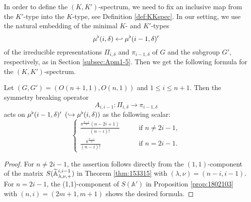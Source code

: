 In order to define the $(K,K')$-spectrum,
 we need to fix an inclusive map from 
 the $K'$-type into the $K$-type,
 see Definition \ref{def:KKspec}.  
In our setting, 
 we use the natural embedding of the minimal $K$- and $K'$-types
\begin{equation}
\label{eqn:KKemb}
  \mu^{\flat} (i,\delta) \hookleftarrow \mu^{\flat} (i-1,\delta)'
\end{equation}
 of the irreducible representations $\Pi_{i,\delta}$ and $\pi_{i-1,\delta}$
 of $G$ and the subgroup $G'$, 
 respectively,
 as in Section \ref{subsec:Apm1-5}.  
Then we get the following formula
 for the 
$(K,K')$-spectrum.  

\begin{proposition}
\label{prop:Aidown}
Let $(G, G')=(O(n+1,1), O(n,1))$ and $1 \le i \le n+1$. 
Then the symmetry breaking operator
\[
     A_{i,i-1} \colon \Pi_{i,\delta} \to \pi_{i-1,\delta}
\]
 acts on $\mu^{\flat}(i-1,\delta)'$ $(\hookrightarrow \mu^{\flat}(i,\delta))$
 as the following scalar:
\begin{equation*}
\begin{cases}
 \frac{\pi^{\frac{n-1}{2}}(n-2i+1)}{(n-i)!}
\qquad
 &\text{if $n \ne 2i-1$}, 
\\ 
 \frac{\pi^{\frac{n-1}{2}}}{(n-i)!}
  & \text{if $n=2i-1$}.
\end{cases}
\end{equation*}
\end{proposition}
\begin{proof}
For $n \ne 2i-1$, 
 the assertion follows directly from the $(1,1)$-component
 of the matrix $S({\widetilde{\mathbb{A}}}_{{\lambda},{\nu},{+}}^{{i,i-1}})$
 in Theorem \ref{thm:153315}
 with $(\lambda,\nu)=(n-i,i-1)$.  
For $n=2i-1$, 
 the (1,1)-component of $S({\mathbb{A}}')$ in Proposition \ref{prop:1802103}
 with $(n,i)=(2m+1,m+1)$ shows the desired formula.  
\end{proof}

